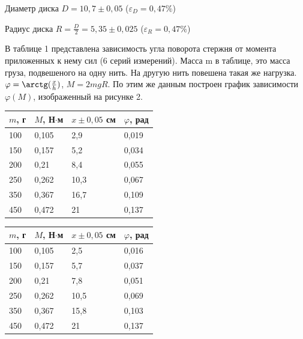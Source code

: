 \documentclass[a4paper, 12pt]{article}
\begin{document}
Диаметр диска $D = 10,7\pm0,05$ ($\varepsilon_D = 0,47\%$)

Радиус диска $R = \frac{D}{2} = 5,35 \pm0,025$ ($\varepsilon_R = 0,47\%$)

В таблице 1 представлена зависимость угла поворота стержня от момента приложенных к нему сил (6 серий измерений). Масса m в таблице, это масса груза, подвешеного на одну нить. На другую нить повешена такая же нагрузка.$\varphi = \arctg(\frac{x}{h})$, $M = 2mgR$. По этим же данным построен график зависимости $\varphi(M)$, изображенный на рисунке 2.

\begin{table}[h!]
 \centering
    \parbox{.4 \textwidth}{
        \centering
        \begin{tabular}{|l|l|l|l|}
        \hline
            $m$, г & $M$, Н$\cdot$м & $x \pm 0,05$ см & $\varphi$, рад \\ \hline
            100 & 0,105 & 2,9 & 0,019 \\ \hline
            150 & 0,157 & 5,2 & 0,034 \\ \hline
            200 & 0,21 & 8,4 & 0,055 \\ \hline
            250 & 0,262 & 10,3 & 0,067 \\ \hline
            350 & 0,367 & 16,7 & 0,109 \\ \hline
            450 & 0,472 & 21 & 0,137 \\ \hline
        \end{tabular}
        \label{tab:1}
    }
    \hfill
    \parbox{.5 \textwidth}{
        \centering
        \begin{tabular}{|l|l|l|l|}
        \hline
            $m$, г & $M$, Н$\cdot$м & $x \pm 0,05$ см & $\varphi$, рад \\ \hline
            100 & 0,105 & 2,5 & 0,016 \\ \hline
            150 & 0,157 & 5,7 & 0,037 \\ \hline
            200 & 0,21 & 7,8 & 0,051 \\ \hline
            250 & 0,262 & 10,5 & 0,069 \\ \hline
            350 & 0,367 & 15,8 & 0,103 \\ \hline
            450 & 0,472 & 21 & 0,137 \\ \hline
        \end{tabular}
        \label{tab:2}
    }
 \end{table}
\end{document}
